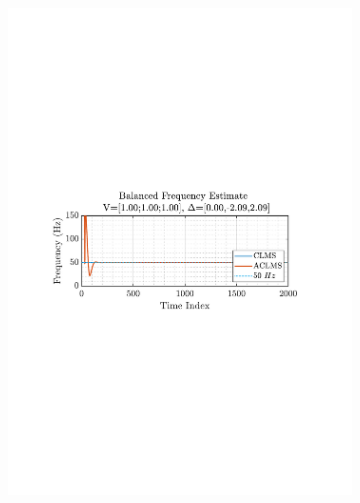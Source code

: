 \documentclass[12pt]{article}
\numberwithin{equation}{section}
\begin{document}
\begin{figure}[H]
\begin{subfigure}{0.49\textwidth}
					\includegraphics[trim={2.2cm 11.2cm 3.00cm  11.2cm}, clip, width=\textwidth]{../MATLAB/figures/q3_1e_fig02.pdf} 
					\captionsetup{justification=centering}
				\end{subfigure}
				

\end{figure}
\end{document}
